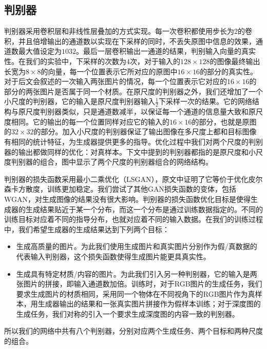 \documentclass[UTF8,openany,AutoFakeBold,AutoFakeSlant,cs4size]{ctexbook}
\begin{document}
\subsection{判别器}

判别器采用卷积层和非线性层叠加的方式实现。每一次卷积都使用步长为$2$的卷积，并且倍增输出的通道数以实现在下采样的同时，不丢失原图中信息的效果，通道数最大值设定为$1032$。最后一层卷积输出一通道的结果，判别输入向量的真实性。在我们的实验中，下采样的次数为$4$次，对于输入的$128 \times 128$的图像最终输出长宽为$8\times8$的向量，每一个位置表示它所对应的原图中$16\times16$的部分的真实性。对于后文会叙述的一次输入两张图片的情况，每一个位置表示它对应的$16\times16$的部分的两张图片是否属于同一个材质。在原尺度的判别器之外，我们还增加了一个小尺度的判别器，它的输入是原尺度判别器输入$\frac{1}{2}$下采样一次的结果。它的网络结构与原尺度判别器类似，只是通道数减半，以保证每一个通道的信息量大致和原尺度相同。它的输出的每一个位置同样对应它的输入的$16\times16$的部分，也就是原图的$32\times32$的部分。加入小尺度的判别器保证了输出图像在多尺度上都和目标图像有相同的统计特征，为生成器提供更多的指导。优化过程中我们对两个尺度的判别器的输出都做同样的优化：对真样本。下文中提到的判别器都指的是原尺度和小尺度判别器的组合，图中显示了两个尺度的判别器组合的网络结构。

判别器的损失函数采用最小二乘优化（LSGAN），原文中证明了它等价于优化皮尔森卡方散度，训练更加稳定。我们尝试了其他GAN损失函数的变体，包括WGAN，对生成图像的结果没有很大影响。判别器的损失函数优化目标是使得生成器的生成结果贴近于某一个分布，而这一个分布是通过训练数据指定的。不同的训练目标对应着不同的指导分布，也就对应着不同的输入数据。在我们的训练过程中，我们希望生成器的生成结果达到下列两个目标：

\begin{itemize}
	\item 生成高质量的图片。为此我们使用生成图片和真实图片分别作为假/真数据的代表输入判别器，这个损失函数使得生成图片能更具真实性。
	\item 生成具有特定材质/内容的图片。为此我们引入另一种判别器，它的输入是两张图片的拼接，即输入通道数加倍。训练时，对于RGB图片的生成任务，我们要求生成图片的材质相同，采用同一个物体在不同视角下的RGB图片作为真样本，用生成器输出的结果和一张真实图片拼接作为假样本训练；对于深度图的生成任务，我们对称的引入一个要求生成深度图的内容一致的判别器。
\end{itemize}

所以我们的网络中共有八个判别器，分别对应两个生成任务、两个目标和两种尺度的组合。
\end{document}
